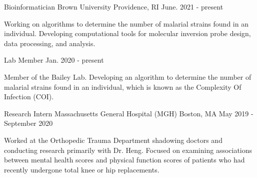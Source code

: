 

\begin{cventries}

\vspace{-1mm}
  \cventry
    {Bioinformatician} %
    {Brown University} %
    {Providence, RI} %
    {June. 2021 - present} %
    {
      \begin{cvitems} %
        \item {Working on algorithms to determine the number of malarial strains found in an individual. Developing computational tools for molecular inversion probe design, data processing, and analysis.}
      \end{cvitems}
    }

\vspace{-1mm}

\cventry
    {Lab Member} %
    {} %
    {} %
    {Jan. 2020 - present} %
    {
      \begin{cvitems} %
        \item {Member of the Bailey Lab. Developing an algorithm to determine the number of malarial strains found in an individual, which is known as the Complexity Of Infection (COI).}
      \end{cvitems}
    }

\vspace{-1mm}
  \cventry
    {Research Intern} %
    {Massachusetts General Hospital (MGH)} %
    {Boston, MA} %
    {May 2019 - September 2020} %
    {
      \begin{cvitems} %
        \item {Worked at the Orthopedic Trauma Department shadowing doctors and conducting research primarily with Dr. Heng. Focused on examining associations between mental health scores and physical function scores of patients who had recently undergone total knee or hip replacements.}
      \end{cvitems}
    }


\end{cventries}
